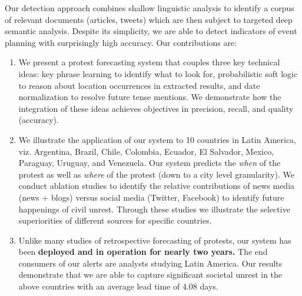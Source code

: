 Our detection approach 
combines shallow linguistic analysis to identify a corpus of relevant
documents (articles, tweets) which are then subject to targeted deep semantic analysis.
Despite its simplicity, we are able to
detect indicators of event planning with surprisingly high
accuracy. Our contributions are:

\iffalse
\begin{figure}
    \texttt{[image: alertstructure]}
    \vspace{-2em}
    \caption{An example warning (left) and GSR event (right).}
    \label{fig:alertstructure}
\end{figure}
\fi

\begin{enumerate}
\item We present a protest forecasting system that couples three key technical ideas:
key phrase learning to identify what to look for, probabilistic soft logic to reason about location occurrences in extracted results, and 
date normalization to resolve future tense mentions. We demonstrate how the integration of these ideas achieves objectives in precision,
recall, and quality (accuracy).
\item We illustrate the application of our system to 10 countries in Latin America, viz. Argentina, Brazil, Chile, Colombia, Ecuador, El Salvador, Mexico, Paraguay, Uruguay, and Venezuela. Our system predicts the {\it when} of the protest
as well as {\it where} of the protest (down to a city level granularity).
We conduct ablation studies to identify the 
relative contributions of news media (news + blogs) versus social media (Twitter, Facebook) to identify future happenings of
civil unrest. Through these studies we illustrate the selective superiorities of different sources for specific countries.
\item Unlike many studies of retrospective forecasting of protests,
our system has been {\bf deployed and in operation for nearly two years.}
The end consumers of our alerts are analysts studying Latin America.
Our results demonstrate that we are able to 
capture significant societal unrest in the above countries with an average lead time of 4.08 days. 

\end{enumerate}

